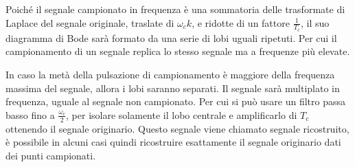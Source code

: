 \documentclass{article}
\numberwithin{equation}{subsection}
\begin{document}
Poiché il segnale campionato in frequenza è una sommatoria delle trasformate di Laplace del segnale originale, traslate di $\omega_ck$, e ridotte di un fattore 
$\displaystyle\frac{1}{T_c}$, il suo diagramma di Bode sarà formato da una serie di lobi uguali ripetuti. Per cui il campionamento di un segnale replica lo stesso segnale 
ma a frequenze più elevate. 
\begin{center}
\end{center}
In caso la metà della pulsazione di campionamento è maggiore della frequenza massima del segnale, allora i lobi 
saranno separati. Il segnale sarà multiplato in frequenza, uguale al segnale non campionato. Per cui si può usare un filtro passa basso fino a 
$\displaystyle\frac{\omega_c}{2}$, per isolare solamente il lobo centrale e amplificarlo di $T_c$ ottenendo il segnale originario. 
Questo segnale viene chiamato segnale ricostruito, è possibile in alcuni casi quindi ricostruire esattamente il segnale originario dati dei punti campionati. 
\end{document}
